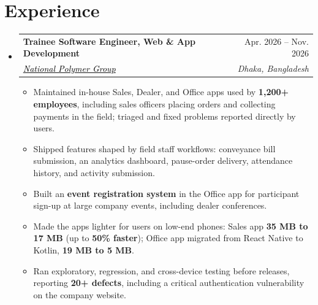 \documentclass[a4paper]{article}
\makeatletter
\newcommand{\resumeItem}[1]{
  \item\small{
    {#1 \vspace{-2pt}}
  }
}
\newcommand{\resumeSubheading}[4]{
  \vspace{-2pt}\item
    \begin{tabular*}{0.97\textwidth}[t]{l@{\extracolsep{\fill}}r}
      \textbf{#1} & #2 \\
      \textit{\small#3} & \textit{\small #4} \\
    \end{tabular*}\vspace{-7pt}
}
\newcommand{\resumeSubHeadingListStart}{\begin{itemize}[leftmargin=0.15in, label={}]}
\newcommand{\resumeSubHeadingListEnd}{\end{itemize}}
\newcommand{\resumeItemListStart}{\begin{itemize}}
\newcommand{\resumeItemListEnd}{\end{itemize}\vspace{-5pt}}
\makeatother
\begin{document}
\section{Experience}
  \resumeSubHeadingListStart
    \resumeSubheading
      {Trainee Software Engineer, Web \& App Development}{Apr. 2026 -- Nov. 2026}
      {\href{https://www.nationalpolymer.net/}{\textcolor{black}{National Polymer Group}}}{Dhaka, Bangladesh}
      \resumeItemListStart
        \resumeItem{Maintained in-house Sales, Dealer, and Office apps used by \textbf{1,200+ employees}, including sales officers placing orders and collecting payments in the field; triaged and fixed problems reported directly by users.}
        \resumeItem{Shipped features shaped by field staff workflows: conveyance bill submission, an analytics dashboard, pause-order delivery, attendance history, and activity submission.}
        \resumeItem{Built an \textbf{event registration system} in the Office app for participant sign-up at large company events, including dealer conferences.}
        \resumeItem{Made the apps lighter for users on low-end phones: Sales app \textbf{35 MB to 17 MB} (up to \textbf{50\% faster}); Office app migrated from React Native to Kotlin, \textbf{19 MB to 5 MB}.}
        \resumeItem{Ran exploratory, regression, and cross-device testing before releases, reporting \textbf{20+ defects}, including a critical authentication vulnerability on the company website.}
      \resumeItemListEnd
  \resumeSubHeadingListEnd


\end{document}
